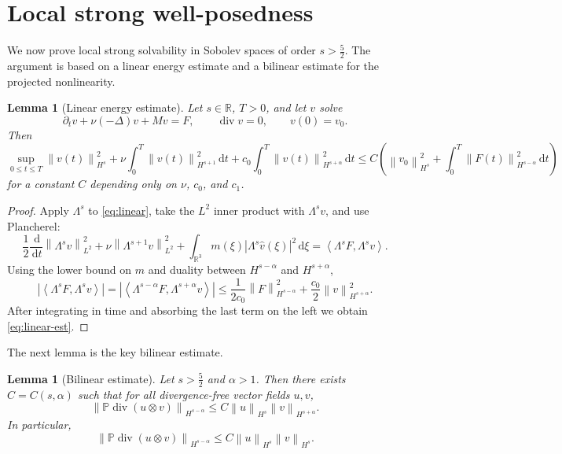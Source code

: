 \documentclass[11pt]{article}
\newtheorem{lemma}[theorem]{Lemma}
\theoremstyle{definition}
\theoremstyle{remark}
\newcommand{\R}{\mathbb{R}}
\newcommand{\Pcal}{\mathbb{P}}
\newcommand{\dd}{\,\mathrm{d}}
\newcommand{\ip}[2]{\left\langle #1,#2\right\rangle}
\newcommand{\norm}[1]{\left\lVert #1\right\rVert}
\newcommand{\abs}[1]{\left\lvert #1\right\rvert}
\newcommand{\diver}{\operatorname{div}}
\begin{document}
\section{Local strong well-posedness}\label{sec:local}

We now prove local strong solvability in Sobolev spaces of order $s>\frac52$. The argument is based on a linear energy estimate and a bilinear estimate for the projected nonlinearity.

\begin{lemma}[Linear energy estimate]\label{lem:linear}
Let $s\in\R$, $T>0$, and let $v$ solve
\begin{equation}\label{eq:linear}
\partial_t v + \nu(-\Delta)v + M v = F,
\qquad
\diver v=0,
\qquad
v(0)=v_0.
\end{equation}
Then
\begin{equation}\label{eq:linear-est}
\sup_{0\le t\le T}\norm{v(t)}_{H^s}^2
+
\nu \int_0^T \norm{v(t)}_{H^{s+1}}^2 \dd t
+
c_0 \int_0^T \norm{v(t)}_{H^{s+\alpha}}^2 \dd t
\le
C\left(
\norm{v_0}_{H^s}^2
+
\int_0^T \norm{F(t)}_{H^{s-\alpha}}^2 \dd t
\right)
\end{equation}
for a constant $C$ depending only on $\nu$, $c_0$, and $c_1$.
\end{lemma}

\begin{proof}
Apply $\Lambda^s$ to \eqref{eq:linear}, take the $L^2$ inner product with $\Lambda^s v$, and use Plancherel:
\[
\frac12 \frac{\dd}{\dd t}\norm{\Lambda^s v}_{L^2}^2
+
\nu \norm{\Lambda^{s+1}v}_{L^2}^2
+
\int_{\R^3} m(\xi)\abs{\Lambda^s \hat v(\xi)}^2 \dd \xi
=
\ip{\Lambda^s F}{\Lambda^s v}.
\]
Using the lower bound on $m$ and duality between $H^{s-\alpha}$ and $H^{s+\alpha}$,
\[
\abs{\ip{\Lambda^s F}{\Lambda^s v}}
=
\abs{\ip{\Lambda^{s-\alpha}F}{\Lambda^{s+\alpha}v}}
\le
\frac{1}{2c_0}\norm{F}_{H^{s-\alpha}}^2
+
\frac{c_0}{2}\norm{v}_{H^{s+\alpha}}^2.
\]
After integrating in time and absorbing the last term on the left we obtain \eqref{eq:linear-est}.
\end{proof}

The next lemma is the key bilinear estimate.

\begin{lemma}[Bilinear estimate]\label{lem:bilinear}
Let $s>\frac52$ and $\alpha>1$. Then there exists $C=C(s,\alpha)$ such that for all divergence-free vector fields $u,v$,
\begin{equation}\label{eq:bilinear}
\norm{\Pcal\diver(u\otimes v)}_{H^{s-\alpha}}
\le
C \norm{u}_{H^s}\norm{v}_{H^{s+\alpha}}.
\end{equation}
In particular,
\begin{equation}\label{eq:bilinear-local}
\norm{\Pcal\diver(u\otimes v)}_{H^{s-\alpha}}
\le
C \norm{u}_{H^s}\norm{v}_{H^s}.
\end{equation}
\end{lemma}
\end{document}

